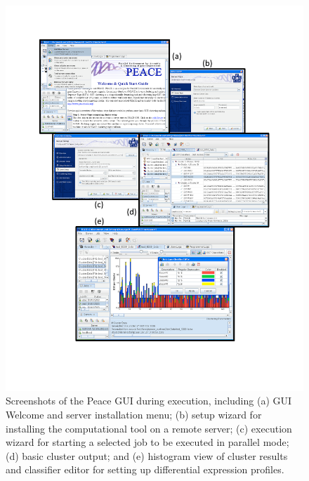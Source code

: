 \documentclass[a4,center,fleqn]{NAR}
\begin{document}
\begin{figure}[b]
\centerline{
\includegraphics[trim=0cm 3cm 0cm 1cm, clip, scale=0.9]{screen.d/screen.pdf} 
}
\label{screen}
\caption{Screenshots of the {\sc Peace} GUI during execution, including (a)
GUI Welcome and server installation menu; (b) setup wizard for
installing the computational tool on a remote server; (c) execution
wizard for starting a selected job to be executed in parallel mode;
(d) basic cluster output; and (e) histogram view of cluster results
and classifier editor for setting up differential expression profiles.}
\end{figure}
\end{document}
